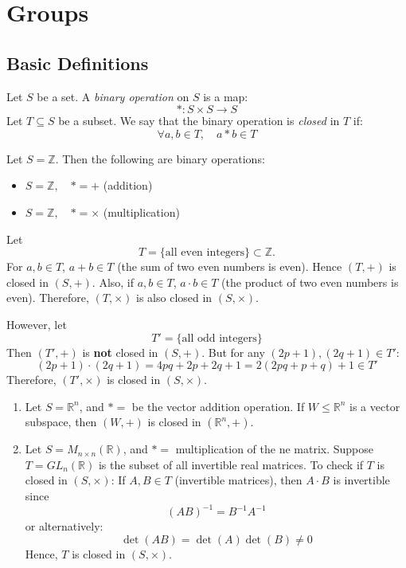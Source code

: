 \chapter{Groups}
\section{Basic Definitions}
\begin{definition}
Let $S$ be a set. A \textit{binary operation} on $S$ is a map:
\[
* : S \times S \to S
\]
Let $T \subseteq S$ be a subset. We say that the binary operation is \textit{closed} in $T$ if:
\[
\forall a, b \in T, \quad a * b \in T
\]
\end{definition}

\begin{example} Let $S = \mathbb{Z}$. Then the following are binary operations:
\begin{itemize}
    \item $S = \mathbb{Z}, \quad * = +$ (addition)  
    \item $S = \mathbb{Z}, \quad * = \times$ (multiplication)
\end{itemize}
Let 
\[T = \{\text{all even integers}\} \subset \mathbb{Z}.
\] 
For $a, b \in T$, $a+b \in T$ (the sum of two even numbers is even).  
Hence $(T, +)$ is closed in $(S, +)$. Also, if $a,b \in T$, $a \cdot b \in T$ (the product of two even numbers is even).  
Therefore, $(T, \times)$ is also closed in $(S, \times)$.

However, let 
\[
T' = \{\text{all odd integers}\}
\]
Then $(T', +)$ is \textbf{not} closed in $(S, +)$. But for any $(2p+1), (2q+1) \in T'$:
\[
(2p+1)\cdot(2q+1) = 4pq + 2p + 2q + 1
= 2(2pq + p + q) + 1 \in T'
\]
Therefore, $(T', \times)$ is closed in $(S, \times)$.
\end{example}

\begin{example}
\begin{enumerate}
\item Let $S = \mathbb{R}^n$, and $* =$ be the vector addition operation.  
If $W \leq \mathbb{R}^n$ is a vector subspace, then $(W, +)$ is closed in $(\mathbb{R}^n, +)$.

\item Let $S = M_{n\times n}(\mathbb{R})$, and $* =$ multiplication of the ne matrix. Suppose $T = GL_n(\mathbb{R})$ is the subset of all invertible real matrices.  
To check if $T$ is closed in $(S, \times)$:
If $A, B \in T$ (invertible matrices), then  
$A \cdot B$ is invertible since
\[
(AB)^{-1} = B^{-1}A^{-1}
\]
or alternatively:
\[
\det(AB) = \det(A)\det(B) \neq 0
\]
Hence, $T$ is closed in $(S, \times)$.
\end{enumerate}
\end{example}

